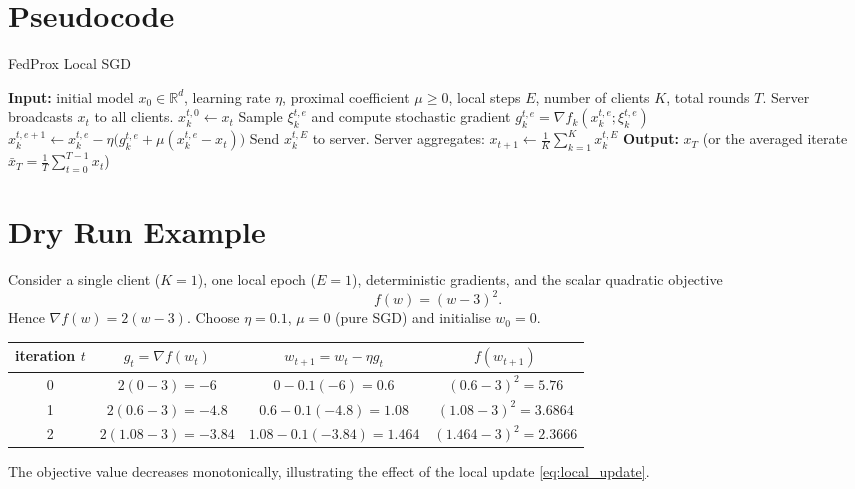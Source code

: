 \documentclass{article}
\newcommand{\R}{\mathbb{R}}
\begin{document}
\section*{Pseudocode}
\begin{algorithm}[H]
\caption{FedProx Local SGD}
\begin{algorithmic}[1]
\STATE \textbf{Input:} initial model $x_0\in\R^d$, learning rate $\eta$, proximal coefficient $\mu\ge0$, local steps $E$, number of clients $K$, total rounds $T$.
    \STATE Server broadcasts $x_t$ to all clients.
        \STATE $x_{k}^{t,0}\leftarrow x_t$
            \STATE Sample $\xi_{k}^{t,e}$ and compute stochastic gradient $g_{k}^{t,e}=\nabla f_k(x_{k}^{t,e};\xi_{k}^{t,e})$
            \STATE $x_{k}^{t,e+1}\leftarrow x_{k}^{t,e}-\eta\bigl(g_{k}^{t,e}+\mu(x_{k}^{t,e}-x_t)\bigr)$ 
        \ENDFOR
        \STATE Send $x_{k}^{t,E}$ to server.
    \ENDFOR
    \STATE Server aggregates: $x_{t+1}\leftarrow\frac1K\sum_{k=1}^{K}x_{k}^{t,E}$ 
\ENDFOR
\STATE \textbf{Output:} $x_T$ (or the averaged iterate $\bar x_T=\frac1T\sum_{t=0}^{T-1}x_t$)
\end{algorithmic}
\end{algorithm}

\section*{Dry Run Example}
Consider a single client ($K=1$), one local epoch ($E=1$), deterministic gradients, and the scalar quadratic objective
\[
f(w)=(w-3)^2.
\]
Hence $\nabla f(w)=2(w-3)$.  Choose $\eta=0.1$, $\mu=0$ (pure SGD) and initialise $w_0=0$.

\begin{center}
\begin{tabular}{c|c|c|c}
iteration $t$ & $g_t=\nabla f(w_t)$ & $w_{t+1}=w_t-\eta g_t$ & $f(w_{t+1})$\\\hline
0 & $2(0-3)=-6$ & $0-0.1(-6)=0.6$ & $(0.6-3)^2=5.76$\\
1 & $2(0.6-3)=-4.8$ & $0.6-0.1(-4.8)=1.08$ & $(1.08-3)^2=3.6864$\\
2 & $2(1.08-3)=-3.84$ & $1.08-0.1(-3.84)=1.464$ & $(1.464-3)^2=2.3666$\\
\end{tabular}
\end{center}
The objective value decreases monotonically, illustrating the effect of the local update \eqref{eq:local_update}.
\end{document}
